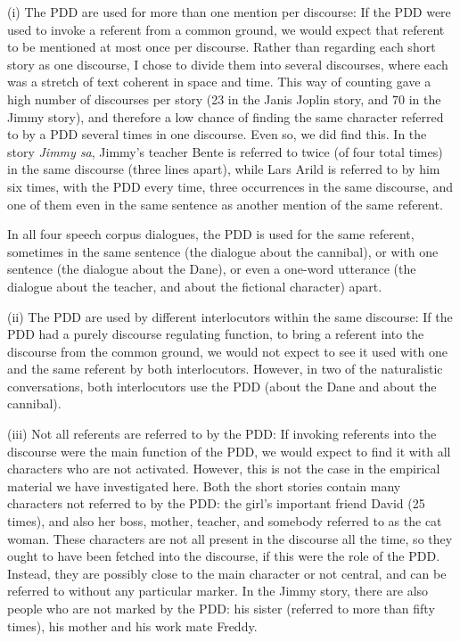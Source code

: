 \documentclass[output=paper,colorlinks,citecolor=brown]{langscibook}
\begin{document}
(i) The PDD are used for more than one mention per discourse: If the PDD were used to invoke a referent from a common ground, we would expect that referent to be mentioned at most once per discourse. Rather than regarding each short story as one discourse, I chose to divide them into several discourses, where each was a stretch of text coherent in space and time. This way of counting gave a high number of discourses per story (23 in the Janis Joplin story, and 70 in the Jimmy story), and therefore a low chance of finding the same character referred to by a PDD several times in one discourse. Even so, we did find this. In the story \textit{Jimmy sa}, Jimmy’s teacher Bente is referred to twice (of four total times) in the same discourse (three lines apart), while Lars Arild is referred to by him six times, with the PDD every time, three occurrences in the same discourse, and one of them even in the same sentence as another mention of the same referent. 

In all four speech corpus dialogues, the PDD is used for the same referent, sometimes in the same sentence (the dialogue about the cannibal), or with one sentence (the dialogue about the Dane), or even a one-word utterance (the dialogue about the teacher, and about the fictional character) apart. 

(ii) The PDD are used by different interlocutors within the same discourse: If the PDD had a purely discourse regulating function, to bring a referent into the discourse from the common ground, we would not expect to see it used with one and the same referent by both interlocutors. However, in two of the naturalistic conversations, both interlocutors use the PDD (about the Dane and about the cannibal).

(iii) Not all referents are referred to by the PDD: If invoking referents into the discourse were the main function of the PDD, we would expect to find it with all characters who are not activated. However, this is not the case in the empirical material we have investigated here. Both the short stories contain many characters not referred to by the PDD: the girl’s important friend David (25 times), and also her boss, mother, teacher, and somebody referred to as the cat woman. These characters are not all present in the discourse all the time, so they ought to have been fetched into the discourse, if this were the role of the PDD. Instead, they are possibly close to the main character or not central, and can be referred to without any particular marker. In the Jimmy story, there are also people who are not marked by the PDD: his sister (referred to more than fifty times), his mother and his work mate Freddy.
\end{document}
